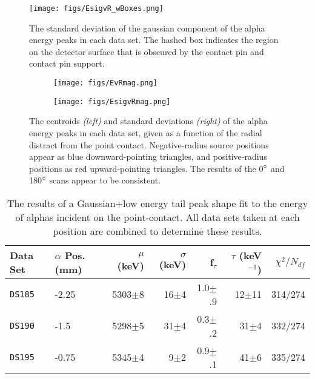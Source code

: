 \documentclass[groupedaddress,rmp,amsmath,amssymb,bibnotes,altaffilletter,twocolumn]{revtex4-1}
\begin{document}
\begin{figure}[]
 \centering
 \texttt{[image: figs/EsigvR\_wBoxes.png]}
 \caption{The standard deviation of the gaussian component of the alpha energy peaks in each data set. The hashed box indicates the region on the detector surface that is obscured by the contact pin and contact pin support.} 
 \label{fig:Efit_sig}
\end{figure}

\begin{figure*}[]
 \centering
 \begin{subfigure}[]{.45\textwidth}
 \texttt{[image: figs/EvRmag.png]}
\end{subfigure}
 \begin{subfigure}[]{.45\textwidth}
 \texttt{[image: figs/EsigvRmag.png]}
\end{subfigure}
 \caption{The centroids {\it (left)} and standard deviations {\it (right)} of the alpha energy peaks in each data set, given as a function of the radial distract from the point contact. Negative-radius source positions appear as blue downward-pointing triangles, and positive-radius positions as red upward-pointing triangles. The results of the 0$\degree$ and 180$\degree$ scans appear to be consistent.} 
 \label{fig:Efit_rMag}
\end{figure*}

\begin{table*}[]
\begin{center}
\begin{tabular}{l l r r r r r}
Data Set & $\alpha$ Pos. (mm) & $\mu$ (keV) & $\sigma$ (keV) & f$_{\tau}$ & $\tau$ (keV$^{-1}$)& $\chi^2/N_{df}$ \\  \hline
{\tt DS185} & -2.25 & 5303$\pm$8 & 16$\pm$4 & 1.0$\pm$.9 & 12$\pm$11 & 314/274 \\
{\tt DS190} & -1.5 & 5298$\pm$5 & 31$\pm$4 & 0.3$\pm$.2 & 31$\pm$4 & 332/274 \\
{\tt DS195} & -0.75 & 5345$\pm$4 & 9$\pm$2 & 0.9$\pm$.1 & 41$\pm$6 & 335/274 \\
\end{tabular}
\caption{The results of a Gaussian+low energy tail peak shape fit to the energy of alphas incident on the point-contact. All data sets taken at each position are combined to determine these results.} \label{tab:fullE_fitRes}
\end{center}
\end{table*}
\end{document}
